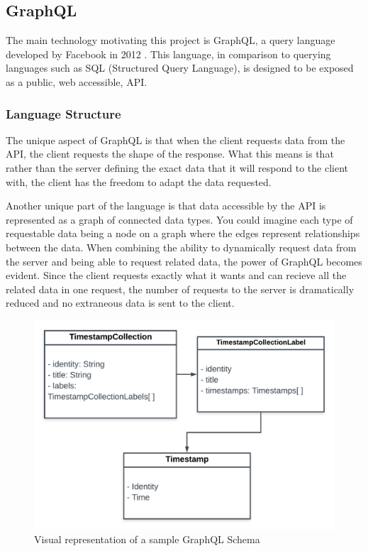 \subsection{GraphQL}
The main technology motivating this project is GraphQL, a query language developed by Facebook in 2012 \cite{byronKeynoteBriefHistory2019}.  This language, in comparison to querying languages such as SQL (Structured Query Language), is designed to be exposed as a public, web accessible, API.

\subsubsection{Language Structure}

The unique aspect of GraphQL is that when the client requests data from the API, the client requests the shape of the response.  What this means is that rather than the server defining the exact data that it will respond to the client with, the client has the freedom to adapt the data requested.

Another unique part of the language is that data accessible by the API is represented as a graph of connected data types.  You could imagine each type of requestable data being a node on a graph where the edges represent relationships between the data.  When combining the ability to dynamically request data from the server and being able to request related data, the power of GraphQL becomes evident.  Since the client requests exactly what it wants and can recieve all the related data in one request, the number of requests to the server is dramatically reduced and no extraneous data is sent to the client.

\begin{figure}[htbp]
    \centering
    \includegraphics[scale=.15]{img/schema-graph.png}
    \caption{Visual representation of a sample GraphQL Schema}
    \label{fig:schema-graph}
\end{figure}

